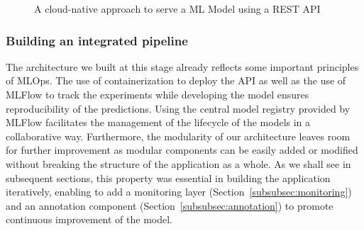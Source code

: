 \begin{figure}[htbp]
    \centering
    \caption{A cloud-native approach to serve a ML Model using a REST API}
    \label{fig:api-datalab}
\end{figure}

\subsubsection{Building an integrated pipeline}

The architecture we built at this stage already reflects some important principles of MLOps. The use of containerization to deploy the API as well as the use of MLFlow to track the experiments while developing the model ensures reproducibility of the predictions. Using the central model registry provided by MLFlow facilitates the management of the lifecycle of the models in a collaborative way. Furthermore, the modularity of our architecture leaves room for further improvement as modular components can be easily added or modified without breaking the structure of the application as a whole. As we shall see in subsequent sections, this property was essential in building the application iteratively, enabling to add a monitoring layer (Section~\ref{subsubsec:monitoring}) and an annotation component (Section~\ref{subsubsec:annotation}) to promote continuous improvement of the model.

